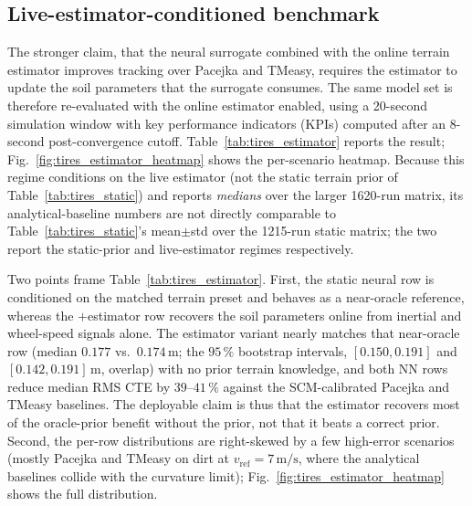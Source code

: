 \documentclass[conference,letterpaper,10pt]{IEEEtran}
\begin{document}
\subsection{Live-estimator-conditioned benchmark}
\label{sec:tires_estimator}

The stronger claim, that the neural surrogate combined with the
online terrain estimator improves tracking over Pacejka and TMeasy,
requires the estimator to update the soil parameters that
the surrogate consumes. The same model set is therefore re-evaluated
with the online estimator enabled, using a 20-second simulation
window with key performance indicators (KPIs) computed after an
8-second post-convergence cutoff.
Table~\ref{tab:tires_estimator} reports the result;
Fig.~\ref{fig:tires_estimator_heatmap} shows the per-scenario
heatmap. Because this regime conditions on the live estimator (not the
static terrain prior of Table~\ref{tab:tires_static}) and reports
\emph{medians} over the larger 1620-run matrix, its analytical-baseline
numbers are not directly comparable to Table~\ref{tab:tires_static}'s
mean$\pm$std over the 1215-run static matrix; the two report the
static-prior and live-estimator regimes respectively.

Two points frame Table~\ref{tab:tires_estimator}. First, the static
neural row is conditioned on the matched terrain preset and behaves as a
near-oracle reference, whereas the $+$estimator row recovers the soil
parameters online from inertial and wheel-speed signals alone. The
estimator variant nearly matches that near-oracle row (median $0.177$
vs.\ $0.174\,\mathrm{m}$; the $95\,\%$ bootstrap intervals,
$[0.150,0.191]$ and $[0.142,0.191]\,\mathrm{m}$, overlap) with no prior
terrain knowledge, and both NN rows reduce median RMS CTE by
$39$--$41\,\%$ against the SCM-calibrated Pacejka and TMeasy baselines.
The deployable claim is thus that the estimator recovers most of the
oracle-prior benefit without the prior, not that it beats a correct
prior. Second, the per-row distributions are right-skewed by a few
high-error scenarios (mostly Pacejka and TMeasy on dirt at
$v_{\mathrm{ref}}\!=\!7\,\mathrm{m/s}$, where the analytical baselines
collide with the curvature limit); Fig.~\ref{fig:tires_estimator_heatmap}
shows the full distribution.
\end{document}
